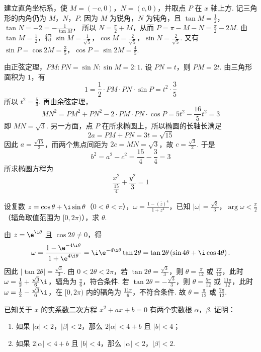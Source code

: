 \begin{solution}
建立直角坐标系，使 \(M=(-c,0)\)，\(N=(c,0)\)，并取点 \(P\) 在 \(x\) 轴上方. 记三角形的内角仍为 \(M\)，\(N\)，\(P\). 因为 \(M\) 为锐角，\(N\) 为钝角，且
\(\tan M=\frac{1}{2}\)，\(\tan N=-2=-\frac{1}{\tan M}\)，
所以 \(N=\frac{\pi}{2}+M\)，从而 \(P=\pi-M-N=\frac{\pi}{2}-2M\).
由 \(\tan M=\frac{1}{2}\)，得 \(\sin M=\frac{1}{\sqrt{5}}\)，\(\cos M=\frac{2}{\sqrt{5}}\)，\(\sin N=\frac{2}{\sqrt{5}}\). 又有 \(\sin P=\cos 2M=\frac{3}{5}\)，\(\cos P=\sin 2M=\frac{4}{5}\).

由正弦定理，\(PM:PN=\sin N:\sin M=2:1\). 设 \(PN=t\)，则 \(PM=2t\). 由三角形面积为 \(1\)，有
\[
1=\frac{1}{2}\cdot PM\cdot PN\cdot\sin P=t^2\cdot\frac{3}{5}
\]
所以 \(t^2=\frac{5}{3}\). 再由余弦定理，
\[
MN^2=PM^2+PN^2-2\cdot PM\cdot PN\cdot\cos P
=5t^2-\frac{16}{5}t^2=3
\]
即 \(MN=\sqrt{3}\). 另一方面，点 \(P\) 在所求椭圆上，所以椭圆的长轴长满足
\[
2a=PM+PN=3t=\sqrt{15}
\]
因此 \(a=\frac{\sqrt{15}}{2}\)，而两个焦点间距为 \(2c=MN=\sqrt{3}\)，故 \(c=\frac{\sqrt{3}}{2}\). 于是
\[
b^2=a^2-c^2=\frac{15}{4}-\frac{3}{4}=3
\]
所求椭圆方程为
\[
\frac{x^2}{\frac{15}{4}}+\frac{y^2}{3}=1
\]
\end{solution}

\begin{problem}
设复数 \(z = \cos \theta + \i\sin \theta\)（\(0 < \theta < \pi\)），\(\omega = \frac{1 - \left( \overline{z} \right)^4}{1 + z^4}\)，已知 \(|\omega| = \frac{\sqrt{3}}{3}\)，\(\arg \omega < \frac{\pi}{2}\)（辐角取值范围为 \([0,2\pi)\)），求 \(\theta\).
\end{problem}

\begin{solution}
由 \(z=\e^{\i\theta}\) 且 \(\cos2\theta\ne0\)，得
\[
\omega=\frac{1-\e^{-4\i\theta}}{1+\e^{4\i\theta}}
=\i\e^{-4\i\theta}\tan2\theta
=\tan2\theta\left(\sin4\theta+\i\cos4\theta\right).
\]
因此 \(\lvert\tan2\theta\rvert=\frac{\sqrt3}{3}\). 由 \(0<2\theta<2\pi\)，若
\(\tan2\theta=\frac{\sqrt3}{3}\)，则 \(\theta=\frac{\pi}{12}\) 或 \(\frac{7\pi}{12}\)，此时
\(\omega=\frac12+\frac{\sqrt3}{6}\i\)，辐角为 \(\frac\pi6\)，符合条件.
若 \(\tan2\theta=-\frac{\sqrt3}{3}\)，则 \(\theta=\frac{5\pi}{12}\) 或 \(\frac{11\pi}{12}\)，此时
\(\omega=\frac12-\frac{\sqrt3}{6}\i\)，在 \([0,2\pi)\) 内的辐角为 \(\frac{11\pi}{6}\)，不符合条件.
故 \(\theta=\frac{\pi}{12}\) 或 \(\frac{7\pi}{12}\).
\end{solution}

\begin{problem}
已知关于 \(x\) 的实系数二次方程 \(x^{2} + ax + b = 0\) 有两个实数根 \(\alpha\)，\(\beta\). 证明：

\begin{enumerate}
\item 如果 \(|\alpha| < 2\)，\(|\beta| < 2\)，那么 \(2|\alpha| < 4 + b\) 且 \(|b| < 4\)；
\item 如果 \(2|\alpha| < 4 + b\) 且 \(|b| < 4\)，那么 \(|\alpha| < 2\)，\(|\beta| < 2\).
\end{enumerate}
\end{problem}

